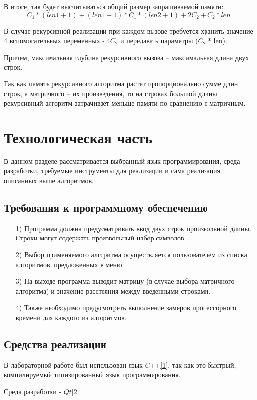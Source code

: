 \documentclass[12pt]{report}
\begin{document}
В итоге, так будет высчитываться общий размер запрашиваемой памяти:
$$C_1 * (len1 + 1) + (len1 + 1) * C_1 * (len2 + 1) + 2C_2 + C_2 * len $$

В случае рекурсивной реализации при каждом вызове требуется хранить значение 4 вспомогательных переменных - 4$C_2$ 
и передавать параметры ($C_2$ * len).

Причем, максимальная глубина рекурсивного вызова – максимальная длина двух строк.

Так как память рекурсивного алгоритма растет пропорционально сумме длин строк, а
матричного – их произведения, то на строках большой длины рекурсивный алгоритм затрачивает меньше памяти по сравнению с матричным.

\chapter{Технологическая часть}
В данном разделе рассматривается выбранный язык программирования, среда разработки, требуемые инструменты для реализации и сама реализация описанных выше алгоритмов.


\section{Требования к программному обеспечению}
\begin{enumerate}
	\item[1)] Программа должна предусматривать ввод двух строк произвольной длины. Строки
	могут содержать произвольный набор символов.
	\item[2)] Выбор применяемого алгоритма осуществляется пользователем из списка алгоритмов,
	предложенных в меню.
	\item[3)] На выходе программа выводит матрицу (в случае выбора матричного алгоритма) и
	значение расстояния между введенными строками.
	\item[4)] Также необходимо предусмотреть выполнение замеров процессорного времени для
	каждого из алгоритмов.

\end{enumerate}

\section{Средства реализации}
В лабораторной работе был использован язык $C$++\hyperref[CPlusPlus]{[1]}, так как это быстрый, компилируемый типизированный язык программирования.

Среда разработки - $Qt$\hyperref[Cute]{[2]}.
\end{document}
